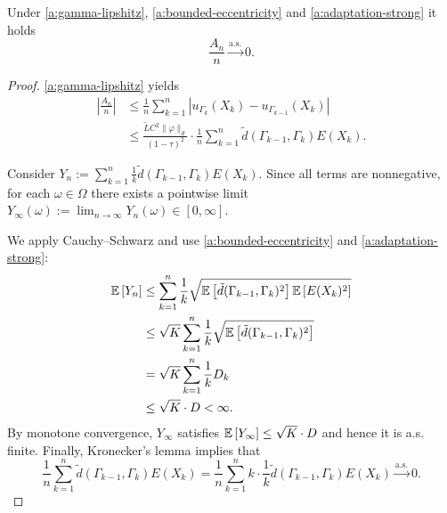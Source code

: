 \begin{lemma}
Under \ref{a:gamma-lipshitz}, \ref{a:bounded-eccentricity} and \ref{a:adaptation-strong} it holds
\[
    \frac{A_n}{n} \xrightarrow{\text{a.s.}} 0.
\]

\begin{proof}
    \ref{a:gamma-lipshitz} yields
    \begin{align*}
        \left\vert\frac{A_n}{n}\right\vert
        & \leq \frac{1}{n} \sum_{k=1}^n \left\vert u_{\Gamma_k}(X_k) - u_{\Gamma_{k-1}}(X_k) \right\vert \\
        &  \leq \frac{\tilde{L} C^2 \| \varphi \|_d}{(1-\tau)^2} \cdot \frac{1}{n} \sum_{k=1}^n \tilde{d}(\Gamma_{k-1}, \Gamma_k) E(X_k).
    \end{align*}

    Consider $Y_n := \sum_{k=1}^n \frac{1}{k} \tilde{d}(\Gamma_{k-1}, \Gamma_k) E(X_k) $. Since all terms are nonnegative, for each $\omega \in \Omega$ there exists a pointwise limit $Y_{\infty}(\omega) := \lim_{n \to \infty} Y_n(\omega) \in [0, \infty]$.
    
    We apply Cauchy–Schwarz and use \ref{a:bounded-eccentricity} and \ref{a:adaptation-strong}:
    \begin{align*}
        \mathbb{E} \left[ Y_n \right] 
        &\leq \sum_{k=1}^n  \frac{1}{k} \sqrt{\mathbb{E} \left[ \tilde{d}(\Gamma_{k-1}, \Gamma_k)^2 \right] \mathbb{E} \left[ E(X_k)^2 \right]} \\
        &\leq \sqrt{K} \sum_{k=1}^n \frac{1}{k}  \sqrt{\mathbb{E} \left[ \tilde{d}(\Gamma_{k-1}, \Gamma_k)^2 \right]} \\
        &= \sqrt{K} \sum_{k=1}^n \frac{1}{k} D_k\\
        &\leq \sqrt{K} \cdot D < \infty.
    \end{align*}
    By monotone convergence, $Y_{\infty}$ satisfies $\mathbb{E} \left[ Y_{\infty} \right] \leq \sqrt{K} \cdot D$ and hence it is a.s. finite.
    Finally, Kronecker's lemma implies that
    \[
        \frac{1}{n} \sum_{k=1}^n \tilde{d}(\Gamma_{k-1}, \Gamma_k) E(X_k) = \frac{1}{n} \sum_{k=1}^n k \cdot \frac{1}{k} \tilde{d}(\Gamma_{k-1}, \Gamma_k) E(X_k) \xrightarrow{\text{a.s.}} 0. 
    \]

\end{proof}
\end{lemma}

